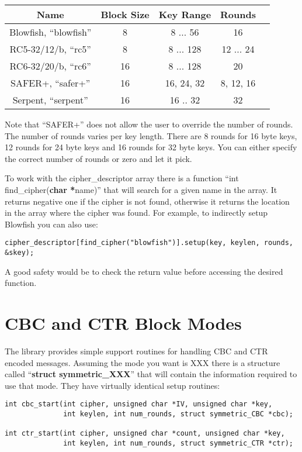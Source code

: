 \documentclass{book}
\begin{document}
\begin{center}
\begin{tabular}{|c|c|c|c|c|}
     \hline Name & Block Size & Key Range & Rounds \\
     \hline Blowfish, ``blowfish'' & 8 & 8 ... 56 & 16 \\
     \hline RC5-32/12/b, ``rc5'' & 8 & 8 ... 128 & 12 ... 24 \\
     \hline RC6-32/20/b, ``rc6'' & 16 & 8 ... 128 & 20 \\
     \hline SAFER+, ``safer+'' & 16 & 16, 24, 32 & 8, 12, 16 \\
     \hline Serpent, ``serpent'' & 16 & 16 .. 32 & 32 \\
     \hline
\end{tabular}
\end{center}

Note that ``SAFER+'' does not allow the user to override the number of rounds.  The number of rounds varies per 
key length.  There are 8 rounds for 16 byte keys, 12 rounds for 24 byte keys and 16 rounds for 32 byte keys.  You can either
specify the correct number of rounds or zero and let it pick.

To work with the cipher\_descriptor array there is a function ``int find\_cipher({\bf char *}name)'' that will search
for a given name in the array.  It returns negative one if the cipher is not found, otherwise it returns the location
in the array where the cipher was found.  For example, to indirectly setup Blowfish you can also use:

\begin{small}
\begin{verbatim}
cipher_descriptor[find_cipher("blowfish")].setup(key, keylen, rounds, &skey);
\end{verbatim}
\end{small}

A good safety would be to check the return value before accessing the desired function.

\section{CBC and CTR Block Modes}
The library provides simple support routines for handling CBC and CTR encoded messages.  Assuming the mode you want
is XXX there is a structure called ``{\bf struct symmetric\_XXX}'' that will contain the information required to
use that mode.  They have virtually identical setup routines:
\begin{verbatim}
int cbc_start(int cipher, unsigned char *IV, unsigned char *key, 
              int keylen, int num_rounds, struct symmetric_CBC *cbc);

int ctr_start(int cipher, unsigned char *count, unsigned char *key, 
              int keylen, int num_rounds, struct symmetric_CTR *ctr);
\end{verbatim}
\end{document}
